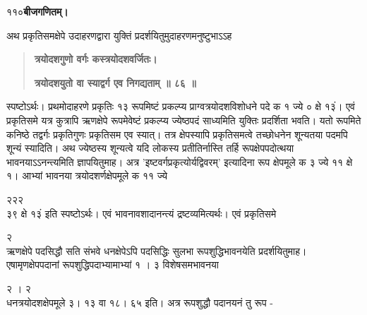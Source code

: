 \documentclass[11pt, openany]{book}
\begin{document}
\thispagestyle{empty}
\newpage

\onehalfspacing
११०\hspace{2in}\textbf{बीजगणितम्।}

\vspace{5mm}

\begin{sloppypar}
\hangindent=0.2in \hspace{0.2in}अथ प्रकृतिसमक्षेपे उदाहरणद्वारा युक्तिं प्रदर्शयितुमुदाहरणमनुष्टुभाऽऽह\textendash

\begin{quote}
\hspace{1in}\textbf{त्रयोदशगुणो वर्गः कस्त्रयोदशवर्जितः।}


\hspace{1in}\textbf{त्रयोदशयुतो वा स्याद्वर्ग एव निगद्यताम् ॥ ८६ ॥}
\end{quote}

\hangindent=0.2in \hspace{0.2in}स्पष्टोऽर्थः। प्रथमोदाहरणे प्रकृतिः १३ रूपमिष्टं प्रकल्प्य प्राग्वत्रयोदशविशोधने पदे क १ ज्ये ० क्षे १३ं। एवं प्रकृतिसमे यत्र कुत्रापि ऋणक्षेपे रूपमेवेष्टं प्रकल्प्य ज्येष्ठपदं साध्यमिति युक्तिः प्रदर्शिता भवति। यतो रूपमिते कनिष्ठे तद्वर्गः प्रकृतिगुणः प्रकृतिसम एव स्यात्। तत्र क्षेपस्यापि प्रकृतिसमत्वे तच्छोधनेन शून्यतया पदमपि शून्यं स्यादिति। अथ ज्येष्ठस्य शून्यत्वे यदि लोकस्य प्रतीतिर्नास्ति तर्हि रूपक्षेपपदोत्थया भावनयाऽऽनन्त्यमिति ज्ञापयितुमाह। अत्र 'इष्टवर्गप्रकृत्योर्यद्विवरम्' इत्यादिना रूप क्षेपमूले क ३ ज्ये ११ क्षे १। आभ्यां भावनया त्रयोदशर्णक्षेपमूले क ११ ज्ये

\hspace{1in}२\hspace{0.3in}२\hspace{3in}२\\

३९ क्षे १३ं इति स्पष्टोऽर्थः। एवं भावनावशादानन्त्यं द्रष्टव्यमित्यर्थः।
एवं प्रकृतिसमे

\hspace{0.1in}२\\

\hangindent=0.2in ऋणक्षेपे पदसिद्धौ सति संभवे धनक्षेपेऽपि पदसिद्धिः सुलभा रूपशुद्धिभावनयेति प्रदर्शयितुमाह। एषामृणक्षेपपदानां रूपशुद्धिपदाभ्यामाभ्यां १ । ३ विशेषसमभावनया

\hspace{2.5in}२ । २\\

\hangindent=0.2in धनत्रयोदशक्षेपमूले ३। १३ वा १८। ६५ इति। अत्र रूपशुद्धौ पदानयनं तु रूप -


\end{sloppypar}
\end{document}
